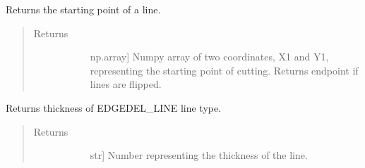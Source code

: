 \documentclass[letterpaper,10pt,english,openany,oneside]{sphinxmanual}
\begin{document}
\begin{fulllineitems}
\begin{fulllineitems}
\label{\detokenize{reference:cnc.optimization.Line.get_starting_point}}
Returns the starting point of a line.
\begin{quote}\begin{description}
\item[{Returns}] \leavevmode\begin{description}
\item[{}] \leavevmode{[}np.array{]}
Numpy array of two coordinates, X1 and Y1, representing the
starting point of cutting. Returns endpoint if lines are flipped.

\end{description}

\end{description}\end{quote}

\end{fulllineitems}


\begin{fulllineitems}
\label{\detokenize{reference:cnc.optimization.Line.get_thickness}}
Returns thickness of EDGEDEL\_LINE line type.
\begin{quote}\begin{description}
\item[{Returns}] \leavevmode\begin{description}
\item[{}] \leavevmode{[}str{]}
Number representing the thickness of the line.

\end{description}

\end{description}\end{quote}

\end{fulllineitems}



\end{fulllineitems}
\end{document}
